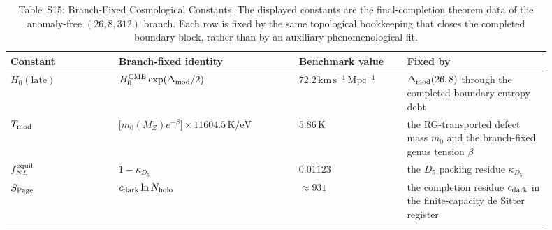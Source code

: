 \documentclass[11pt]{article}
\begin{document}
\begin{table}[t]
\centering
\scriptsize
\setlength{\tabcolsep}{4pt}
\renewcommand{\arraystretch}{1.12}
\begin{tabular}{@{}>{\raggedright\arraybackslash}p{0.18\linewidth}>{\raggedright\arraybackslash}p{0.30\linewidth}>{\centering\arraybackslash}p{0.18\linewidth}>{\raggedright\arraybackslash}p{0.24\linewidth}@{}}
\toprule
Constant & Branch-fixed identity & Benchmark value & Fixed by \\
\midrule
$H_0(\text{late})$ & $H_0^{\rm CMB}\exp\!\left(\Delta_{\rm mod}/2\right)$ & $72.2\,\mathrm{km\,s^{-1}\,Mpc^{-1}}$ & $\Delta_{\rm mod}(26,8)$ through the completed-boundary entropy debt \\

$T_{\rm mod}$ & $\bigl[m_0(M_Z)e^{-\beta}\bigr]\times 11604.5\,\mathrm{K/eV}$ & $5.86\,\mathrm{K}$ & the RG-transported defect mass $m_0$ and the branch-fixed genus tension $\beta$ \\

$f_{NL}^{\rm equil}$ & $1-\kappa_{D_5}$ & $0.01123$ & the $D_5$ packing residue $\kappa_{D_5}$ \\

$S_{\rm Page}$ & $c_{\rm dark}\ln N_{\rm holo}$ & $\approx 931$ & the completion residue $c_{\rm dark}$ in the finite-capacity de Sitter register \\
\bottomrule
\end{tabular}
\caption{Table~S15: Branch-Fixed Cosmological Constants. The displayed constants are the final-completion theorem data of the anomaly-free $(26,8,312)$ branch. Each row is fixed by the same topological bookkeeping that closes the completed boundary block, rather than by an auxiliary phenomenological fit.}
\label{tab:s15-branch-fixed-cosmological-constants}
\end{table}
\end{document}

